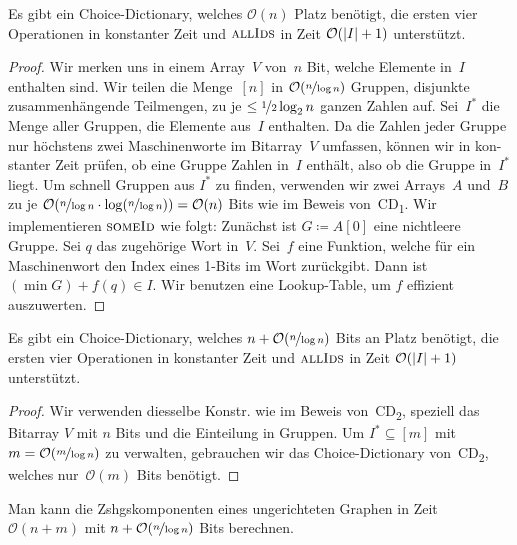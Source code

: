 \documentclass{cheat-sheet}
\renewcommand{\O}{\mathcal{O}} %
\begin{document}
\begin{lem}[CD\textsubscript{2}]
  Es gibt ein Choice-Dictionary, welches $\O(n)$ Platz benötigt, die ersten vier Operationen in konstanter Zeit und $\Call{allIds}{}$ in Zeit $\O(\abs{I} + 1)$ unterstützt.
\end{lem}

\begin{proof}
  Wir merken uns in einem Array~$V$ von~$n$ Bit, welche Elemente in~$I$ enthalten sind.
  Wir teilen die Menge~$[n]$ in $\O(\nicefrac{n}{\log n})$ Gruppen, \dh{} disjunkte zusammenhängende Teilmengen, zu je $\leq \nicefrac{1}{2} \log_2 n$ ganzen Zahlen auf.
  Sei~$I^{*}$ die Menge aller Gruppen, die Elemente aus~$I$ enthalten.
  Da die Zahlen jeder Gruppe nur höchstens zwei Maschinenworte im Bitarray~$V$ umfassen, können wir in kon- stanter Zeit prüfen, ob eine Gruppe Zahlen in~$I$ enthält, also ob die Gruppe in~$I^{*}$ liegt.
  Um schnell Gruppen aus $I^{*}$ zu finden, verwenden wir zwei Arrays~$A$ und~$B$ zu je $\O(\nicefrac{n}{\log n} \cdot \log(\nicefrac{n}{\log n})) = \O(n)$ Bits wie im Beweis von~CD\textsubscript{1}.
  Wir implementieren $\Call{someId}{}$ wie folgt: Zunächst ist $G \coloneqq A[0]$ eine nichtleere Gruppe. Sei $q$ das zugehörige Wort in~$V$. Sei~$f$ eine Funktion, welche für ein Maschinenwort den Index eines 1-Bits im Wort zurückgibt. Dann ist $(\min G) + f(q) \in I$.
  Wir benutzen eine Lookup-Table, um $f$ effizient auszuwerten.
\end{proof}

\begin{thm}[CD\textsubscript{3}]
  Es gibt ein Choice-Dictionary, welches $n + \O(\nicefrac{n}{\log n})$ Bits an Platz benötigt, die ersten vier Operationen in konstanter Zeit und $\Call{allIds}{}$ in Zeit $\O(\abs{I} + 1)$ unterstützt.
\end{thm}

\begin{proof}
  Wir verwenden diesselbe Konstr. wie im Beweis von~CD\textsubscript{2}, speziell das Bitarray $V$ mit $n$ Bits und die Einteilung in Gruppen.
  Um $I^{*} \subseteq [m]$ mit $m = \O(\nicefrac{m}{\log n})$ zu verwalten, gebrauchen wir das Choice-Dictionary von~CD\textsubscript{2}, welches nur~$\O(m)$ Bits benötigt.
\end{proof}

\begin{kor}
  Man kann die Zshgskomponenten eines ungerichteten Graphen in Zeit $\O(n + m)$ mit $n + \O(\nicefrac{n}{\log n})$ Bits berechnen.
\end{kor}

\end{document}
